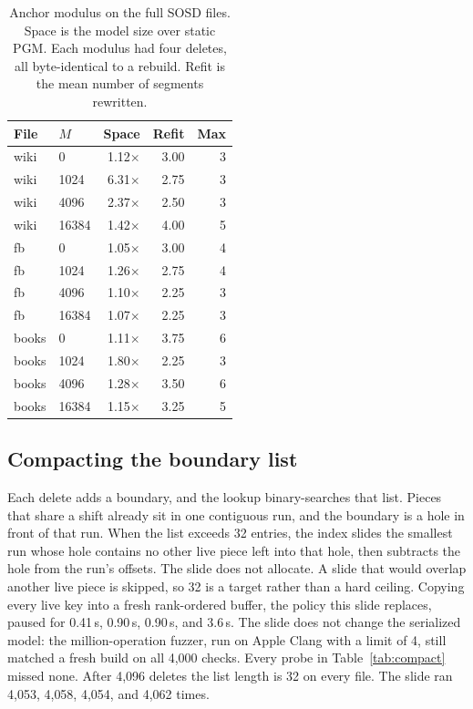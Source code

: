 \documentclass[conference]{IEEEtran}
\begin{document}
\begin{table}[t]
\caption{Anchor modulus on the full SOSD files.
Space is the model size over static PGM.
Each modulus had four deletes, all byte-identical to a rebuild.
Refit is the mean number of segments rewritten.}
\label{tab:anchor}
\centering
\footnotesize
\begin{tabular}{@{}llrrr@{}}
\toprule
File & $M$ & Space & Refit & Max \\
\midrule
wiki  & 0     & 1.12$\times$ & 3.00 & 3 \\
wiki  & 1024  & 6.31$\times$ & 2.75 & 3 \\
wiki  & 4096  & 2.37$\times$ & 2.50 & 3 \\
wiki  & 16384 & 1.42$\times$ & 4.00 & 5 \\
\addlinespace
fb    & 0     & 1.05$\times$ & 3.00 & 4 \\
fb    & 1024  & 1.26$\times$ & 2.75 & 4 \\
fb    & 4096  & 1.10$\times$ & 2.25 & 3 \\
fb    & 16384 & 1.07$\times$ & 2.25 & 3 \\
\addlinespace
books & 0     & 1.11$\times$ & 3.75 & 6 \\
books & 1024  & 1.80$\times$ & 2.25 & 3 \\
books & 4096  & 1.28$\times$ & 3.50 & 6 \\
books & 16384 & 1.15$\times$ & 3.25 & 5 \\
\bottomrule
\end{tabular}
\end{table}

\subsection{Compacting the boundary list}
\label{sec:compact}

Each delete adds a boundary, and the lookup binary-searches that list.
Pieces that share a shift already sit in one contiguous run, and the boundary is a hole in front of that run.
When the list exceeds 32 entries, the index slides the smallest run whose hole contains no other live piece left into that hole, then subtracts the hole from the run's offsets.
The slide does not allocate.
A slide that would overlap another live piece is skipped, so 32 is a target rather than a hard ceiling.
Copying every live key into a fresh rank-ordered buffer, the policy this slide replaces, paused for 0.41\,s, 0.90\,s, 0.90\,s, and 3.6\,s.
The slide does not change the serialized model: the million-operation fuzzer, run on Apple Clang with a limit of 4, still matched a fresh build on all 4{,}000 checks.
Every probe in Table~\ref{tab:compact} missed none.
After 4{,}096 deletes the list length is 32 on every file.
The slide ran 4{,}053, 4{,}058, 4{,}054, and 4{,}062 times.
\end{document}
